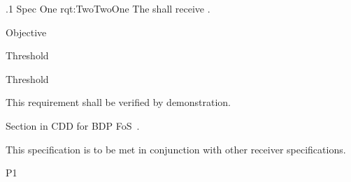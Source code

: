 \ONERQMTVKSA
{\RqtNumberBase.1}
{\ThisSubSegment Spec One}
{rqt:TwoTwoOne}
{The \ThisSys shall receive \TBD.}
{
	\item [Light]  Objective
	\item [Medium] Threshold
	\item [Heavy]  Threshold
}
{This requirement shall be verified by demonstration.}
{
	\item [5.5.5] Section in CDD for BDP FoS~\cite{ref__BDP_FOS_CDD}.
}
{
	\item This specification is to be met in conjunction with other receiver specifications.
}
{P1}

